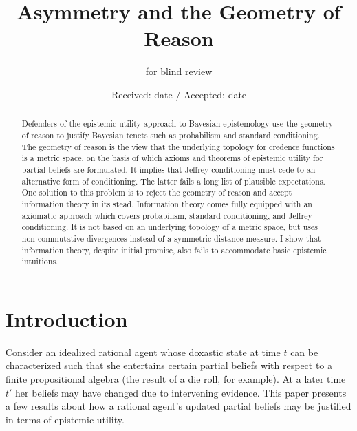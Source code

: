 \documentclass[smallextended]{svjour3}       %
\begin{document}
\title{Asymmetry and the Geometry of Reason}

\author{for blind review}


\date{Received: date / Accepted: date}

\maketitle

\begin{abstract}
  Defenders of the epistemic utility approach to Bayesian epistemology
  use the geometry of reason to justify Bayesian tenets such as
  probabilism and standard conditioning. The geometry of reason is the
  view that the underlying topology for credence functions is a metric
  space, on the basis of which axioms and theorems of epistemic
  utility for partial beliefs are formulated. It implies that Jeffrey
  conditioning must cede to an alternative form of conditioning. The
  latter fails a long list of plausible expectations. One solution to
  this problem is to reject the geometry of reason and accept
  information theory in its stead. Information theory comes fully
  equipped with an axiomatic approach which covers probabilism,
  standard conditioning, and Jeffrey conditioning. It is not based on
  an underlying topology of a metric space, but uses non-commutative
  divergences instead of a symmetric distance measure. I show that
  information theory, despite initial promise, also fails to
  accommodate basic epistemic intuitions.
\end{abstract}

\section{Introduction}
\label{intr}

Consider an idealized rational agent whose doxastic state at time $t$
can be characterized such that she entertains certain partial beliefs
with respect to a finite propositional algebra (the result of a die
roll, for example). At a later time $t'$ her beliefs may have changed
due to intervening evidence. This paper presents a few results about
how a rational agent's updated partial beliefs may be justified in
terms of epistemic utility. 
\end{document}
